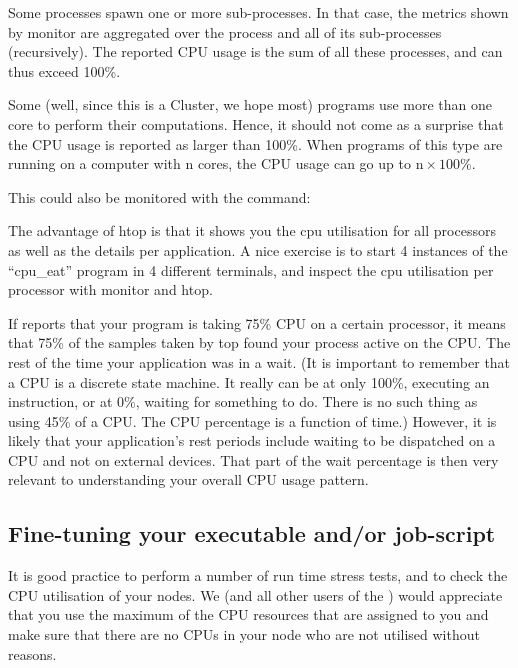   Some processes spawn one or more sub-processes. In that case, the metrics shown
  by monitor are aggregated over the process and all of its sub-processes
  (recursively). The reported CPU usage is the sum of all these processes, and
  can thus exceed 100\%.
  
  Some (well, since this is a \hpc Cluster, we hope most) programs use more
  than one core to perform their computations. Hence, it should not come as a
  surprise that the CPU usage is reported as larger than 100\%. When programs of
  this type are running on a computer with n cores, the CPU usage can go up to $\text{n}
  \times 100\%$.
\fi

This could also be monitored with the  command:
\begin{prompt}
\end{prompt}

\vbox{}


The advantage of htop is that it shows you the cpu utilisation for all
processors as well as the details per application.  A nice exercise is to start
4 instances of the ``cpu\_eat'' program in 4 different terminals, and inspect
the cpu utilisation per processor with monitor and htop.

If  reports that your program is taking 75\% CPU on a
certain processor, it means that 75\% of the samples taken by top found your
process active on the CPU. The rest of the time your application was in a wait.
(It is important to remember that a CPU is a discrete state machine. It really
can be at only 100\%, executing an instruction, or at 0\%, waiting for
something to do. There is no such thing as using 45\% of a CPU. The CPU
percentage is a function of time.) However, it is likely that your
application's rest periods include waiting to be dispatched on a CPU and not on
external devices. That part of the wait percentage is then very relevant to
understanding your overall CPU usage pattern.

\subsection{Fine-tuning your executable and/or job-script}

It is good practice to perform a number of run time stress tests, and to check
the CPU utilisation of your nodes. We (and all other users of the \hpc) would
appreciate that you use the maximum of the CPU resources that are assigned to
you and make sure that there are no CPUs in your node who are not utilised
without reasons.

